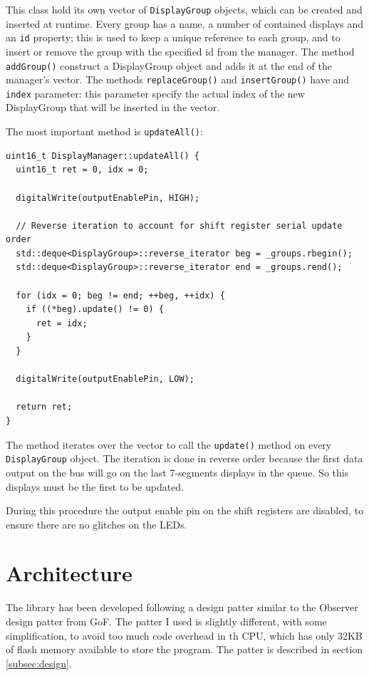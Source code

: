 \documentclass[11pt,english]{article}
\newcommand{\code}[1]{\texttt{#1}}
\begin{document}
This class hold its own vector of \code{DisplayGroup} objects, which can be created and inserted at 
runtime. Every group has a name, a number of contained displays and an \code{id} property; this is 
used to keep a unique reference to each group, and to insert or remove the group with the specified
id from the manager.
The method \code{addGroup()} construct a DisplayGroup object and adds it at the end of the manager's 
vector. The methods \code{replaceGroup()} and \code{insertGroup()} have and \code{index} parameter: 
this parameter specify the actual index of the new DisplayGroup that will be inserted in the vector.

The most important method is \code{updateAll()}:
%                                       
\begin{lstlisting}[label=lis:display-manager-update, caption=DisplayManager update method]
uint16_t DisplayManager::updateAll() {
  uint16_t ret = 0, idx = 0;

  digitalWrite(outputEnablePin, HIGH);

  // Reverse iteration to account for shift register serial update order
  std::deque<DisplayGroup>::reverse_iterator beg = _groups.rbegin();
  std::deque<DisplayGroup>::reverse_iterator end = _groups.rend();

  for (idx = 0; beg != end; ++beg, ++idx) {
    if ((*beg).update() != 0) {
      ret = idx;
    }
  }

  digitalWrite(outputEnablePin, LOW);

  return ret;
}
\end{lstlisting}

The method iterates over the vector to call the \code{update()} method on every \code{DisplayGroup} 
object. The iteration is done in reverse order because the first data output on the bus will go 
on the last 7-segments displays in the queue. So this displays must be the first to be updated.

During this procedure the output enable pin on the shift registers are disabled, to ensure there are 
no glitches on the LEDs.



\section{Architecture}\label{sec:arc}

The library has been developed following a design patter similar to the Observer design patter from
GoF. The patter I used is slightly different, with some simplification, to avoid too much code 
overhead in th CPU, which has only 32KB of flash memory available to store the program. The patter 
is described in section \ref{subsec:design}.
\end{document}
